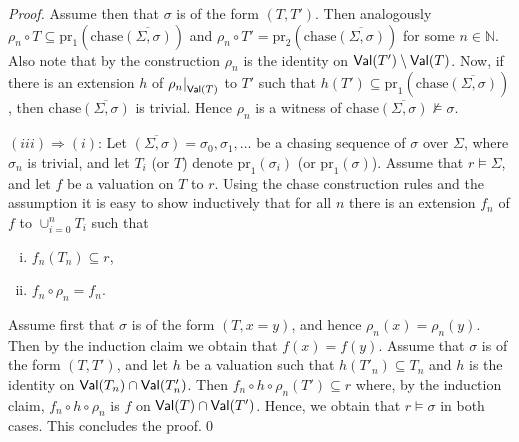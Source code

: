 \documentclass[envcountset]{llncs}
\newcommand{\problemFont}[1]{\protect\ensuremath{\mathsf{#1}}}
\newcommand{\si}{\sigma}
\newcommand{\Si}{\Sigma}
\newcommand{\sub}{\subseteq}
\newcommand{\pr}{\mathrm{pr}}
\newcommand{\N}{\mathbb{N}}
\newcommand\re[2]{{\left.\kern-\nulldelimiterspace #1 \vphantom{|} \right|_{#2} }}
\newcommand{\Val}{\problemFont{Val}}
\newcommand{\chase}[1]{\overline{(#1)}}
\newcommand{\ochase}[1]{\textrm{chase}\overline{(#1)}}
\begin{document}
\begin{proof}
Assume then that $\si$ is of the form $(T,T')$. Then analogously  $\rho_n\circ T \sub \pr_1(\ochase{\Si,\si})$ and $\rho_n\circ T' = \pr_2(\ochase{\Si,\si})$ for some $n\in\N$. Also note that by the construction $\rho_n$ is the identity on $\Val(T')\setminus\Val(T)$. Now, if there is an extension $h$ of $\re{\rho_n}{\Val(T)}$ to $T'$ such that $h(T')\sub \pr_1(\ochase{\Si,\si})$, then $\ochase{\Si,\si}$ is trivial. Hence $\rho_n$ is a witness of $\ochase{\Si,\si}\not\models \si$.

$(iii)\Rightarrow (i)$: Let $\chase{\Si,\si}=\si_0, \si_1,\ldots $ be a chasing sequence of $\si$ over $\Si$, where $\si_n$ is trivial, and let $T_i$ (or $T$) denote $\pr_1(\si_i)$ (or $\pr_1(\si)$). Assume that $r\models \Si$, and let $f$ be a valuation on $T$ to $r$.  Using the chase construction rules and the assumption it is easy to show  inductively that for all $n$ there is an extension $f_n$ of $f$ to $\cup_{i=0}^n T_i$ such that 
\begin{enumerate}[(i)]
\item $f_n(T_n)\sub r$,
\item  $f_n\circ  \rho_n=f_n$.
\end{enumerate} Assume first that $\si$ is of the form $(T,x=y)$, and hence $\rho_n(x)=\rho_n(y)$. Then by the induction claim we obtain that $f(x)=f(y)$. Assume that $\si$ is of the form $(T,T')$, and let $h$ be a valuation such that $h(T'_n) \sub T_n$ and $h$ is the identity on $\Val(T_n)\cap\Val(T'_n)$. Then $f_n \circ h \circ \rho_n (T') \sub r$ where, by the induction claim, $f_n \circ h \circ \rho_n$ is $f$ on $\Val(T)\cap\Val(T')$. Hence, we obtain that $r\models \si$ in both cases. This concludes the proof.\qed



\end{proof}
\end{document}
